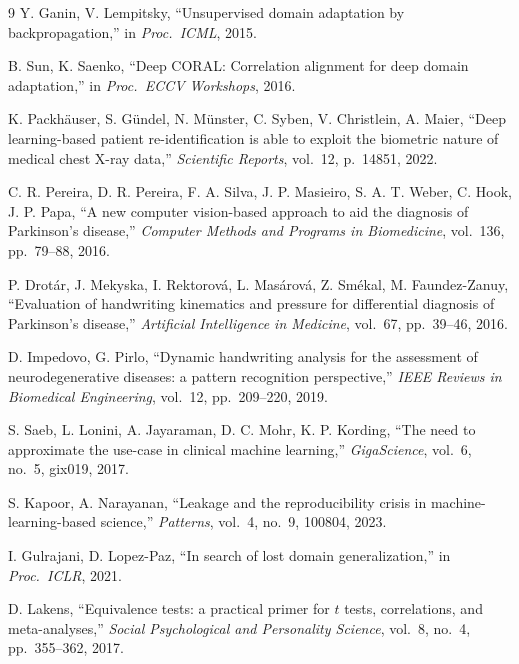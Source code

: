 \documentclass[3p,final,10pt]{elsarticle}
\begin{document}
\begin{thebibliography}{9}
Y. Ganin, V. Lempitsky, ``Unsupervised domain adaptation by
backpropagation,'' in \emph{Proc.\ ICML}, 2015.

B. Sun, K. Saenko, ``Deep CORAL: Correlation alignment for deep domain
adaptation,'' in \emph{Proc.\ ECCV Workshops}, 2016.

K. Packh\"auser, S. G\"undel, N. M\"unster, C. Syben, V. Christlein,
A. Maier, ``Deep learning-based patient re-identification is able to
exploit the biometric nature of medical chest X-ray data,''
\emph{Scientific Reports}, vol.\ 12, p.\ 14851, 2022.

C. R. Pereira, D. R. Pereira, F. A. Silva, J. P. Masieiro, S. A. T. Weber,
C. Hook, J. P. Papa, ``A new computer vision-based approach to aid the
diagnosis of Parkinson's disease,'' \emph{Computer Methods and Programs in
Biomedicine}, vol.\ 136, pp.\ 79--88, 2016.

P. Drot\'{a}r, J. Mekyska, I. Rektorov\'{a}, L. Mas\'{a}rov\'{a},
Z. Sm\'{e}kal, M. Faundez-Zanuy, ``Evaluation of handwriting kinematics
and pressure for differential diagnosis of Parkinson's disease,''
\emph{Artificial Intelligence in Medicine}, vol.\ 67, pp.\ 39--46, 2016.

D. Impedovo, G. Pirlo, ``Dynamic handwriting analysis for the assessment
of neurodegenerative diseases: a pattern recognition perspective,''
\emph{IEEE Reviews in Biomedical Engineering}, vol.\ 12, pp.\ 209--220,
2019.

S. Saeb, L. Lonini, A. Jayaraman, D. C. Mohr, K. P. Kording, ``The need
to approximate the use-case in clinical machine learning,''
\emph{GigaScience}, vol.\ 6, no.\ 5, gix019, 2017.

S. Kapoor, A. Narayanan, ``Leakage and the reproducibility crisis in
machine-learning-based science,'' \emph{Patterns}, vol.\ 4, no.\ 9,
100804, 2023.

I. Gulrajani, D. Lopez-Paz, ``In search of lost domain generalization,''
in \emph{Proc.\ ICLR}, 2021.

D. Lakens, ``Equivalence tests: a practical primer for $t$ tests,
correlations, and meta-analyses,'' \emph{Social Psychological and
Personality Science}, vol.\ 8, no.\ 4, pp.\ 355--362, 2017.

\end{thebibliography}
\end{document}
